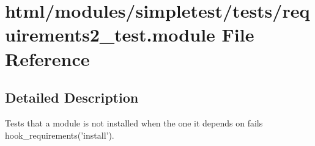 \hypertarget{requirements2__test_8module}{
\section{html/modules/simpletest/tests/requirements2\_\-test.module File Reference}
\label{requirements2__test_8module}
}


\subsection{Detailed Description}
Tests that a module is not installed when the one it depends on fails hook\_\-requirements('install'). 